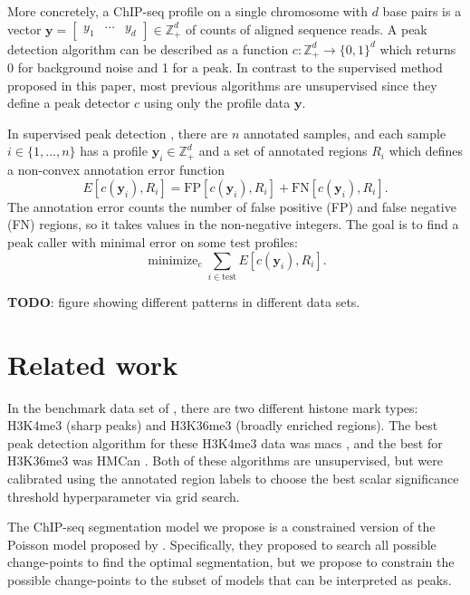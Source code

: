 \documentclass{article}
\DeclareMathOperator*{\minimize}{minimize}
\newcommand{\ZZ}{\mathbb Z}
\begin{document}
More concretely, a ChIP-seq profile on a single
chromosome with $d$ base pairs is a vector $\mathbf y=
\left[
  \begin{array}{ccc}
    y_1 & \cdots & y_d
  \end{array}
\right]\in\ZZ_+^d$ of counts of aligned sequence reads. A peak
detection algorithm can be described as a function $c:\ZZ_+^d
\rightarrow \{0, 1\}^d$ which returns 0 for background noise and 1 for
a peak. In contrast to the supervised method proposed in this paper,
most previous algorithms are unsupervised since they define a peak
detector $c$ using only the profile data $\mathbf y$.

In supervised peak detection \citep{hocking2014visual}, there
are $n$ annotated samples, and each sample $i\in\{1, \dots, n\}$ has a
profile $\mathbf y_i\in\ZZ_+^d$ and a set of annotated regions $R_i$
which defines a non-convex annotation error function
\begin{equation}
  \label{eq:error}
  E[c(\mathbf y_i),  R_i] =
  \text{FP}[c(\mathbf y_i), R_i] +
  \text{FN}[c(\mathbf y_i), R_i].
\end{equation}
The annotation error counts the number of false positive (FP) and
false negative (FN) regions, so it takes values in the non-negative
integers. The goal is to find a peak caller with minimal error on some
test profiles:
\begin{equation}
  \label{eq:min_error}
  \minimize_c \sum_{i\in\text{test}} E[c(\mathbf y_i),  R_i].
\end{equation}

\textbf{TODO}: figure showing different patterns in different data sets.

\section{Related work}

In the benchmark data set of \citet{hocking2014visual}, there are two
different histone mark types: H3K4me3 (sharp peaks) and H3K36me3
(broadly enriched regions). The best peak detection algorithm for
these H3K4me3 data was macs \citep{MACS}, and the best for H3K36me3
was HMCan \citep{HMCan}. Both of these algorithms are unsupervised,
but were calibrated using the annotated region labels to choose the
best scalar significance threshold hyperparameter via grid search.

The ChIP-seq segmentation model we propose is a constrained version of
the Poisson model proposed by \citet{Segmentor}. Specifically,
they proposed to search all possible change-points to find the optimal
segmentation, but we propose to constrain the possible change-points to
the subset of models that can be interpreted as peaks.
\end{document}
